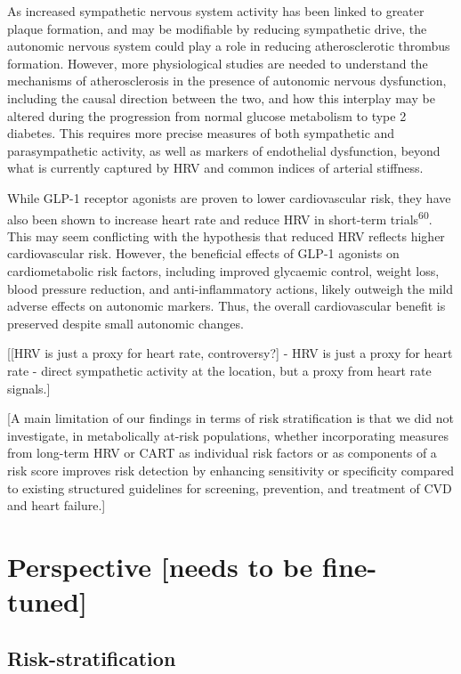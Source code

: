 \documentclass[
  a4paper,
  headsepline=true,
  open=any]{scrbook}
\begin{document}
As increased sympathetic nervous system activity has been linked to
greater plaque formation, and may be modifiable by reducing sympathetic
drive, the autonomic nervous system could play a role in reducing
atherosclerotic thrombus formation. However, more physiological studies
are needed to understand the mechanisms of atherosclerosis in the
presence of autonomic nervous dysfunction, including the causal
direction between the two, and how this interplay may be altered during
the progression from normal glucose metabolism to type 2 diabetes. This
requires more precise measures of both sympathetic and parasympathetic
activity, as well as markers of endothelial dysfunction, beyond what is
currently captured by HRV and common indices of arterial stiffness.

While GLP-1 receptor agonists are proven to lower cardiovascular risk,
they have also been shown to increase heart rate and reduce HRV in
short-term trials\textsuperscript{60}. This may seem conflicting with
the hypothesis that reduced HRV reflects higher cardiovascular risk.
However, the beneficial effects of GLP-1 agonists on cardiometabolic
risk factors, including improved glycaemic control, weight loss, blood
pressure reduction, and anti-inflammatory actions, likely outweigh the
mild adverse effects on autonomic markers. Thus, the overall
cardiovascular benefit is preserved despite small autonomic changes.

{[}{[}HRV is just a proxy for heart rate, controversy?{]} - HRV is just
a proxy for heart rate - direct sympathetic activity at the location,
but a proxy from heart rate signals.{]}

{[}A main limitation of our findings in terms of risk stratification is
that we did not investigate, in metabolically at-risk populations,
whether incorporating measures from long-term HRV or CART as individual
risk factors or as components of a risk score improves risk detection by
enhancing sensitivity or specificity compared to existing structured
guidelines for screening, prevention, and treatment of CVD and heart
failure.{]}


\hypertarget{perspective-needs-to-be-fine-tuned}{%
\chapter{Perspective {[}needs to be
fine-tuned{]}}\label{perspective-needs-to-be-fine-tuned}}

\hypertarget{risk-stratification-1}{%
\section{Risk-stratification}\label{risk-stratification-1}}
\end{document}
